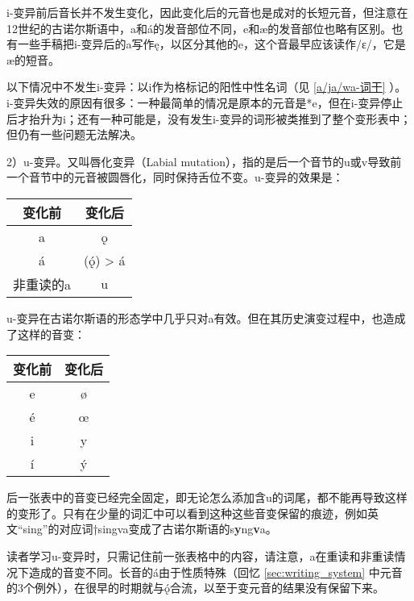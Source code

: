 i-变异前后音长并不发生变化，因此变化后的元音也是成对的长短元音，但注意在12世纪的古诺尔斯语中，a和á的发音部位不同，e和æ的发音部位也略有区别。也有一些手稿把i-变异后的a写作ę，以区分其他的e，这个音最早应该读作/ɛ/，它是æ的短音。

以下情况中不发生i-变异：以i作为格标记的阳性中性名词（见 \ref{a/ja/wa-词干} ）。i-变异失效的原因有很多：一种最简单的情况是原本的元音是*e，但在i-变异停止后才抬升为i；还有一种可能是，没有发生i-变异的词形被类推到了整个变形表中；但仍有一些问题无法解决。

2）u-变异。又叫唇化变异（Labial mutation），指的是后一个音节的u或v导致前一个音节中的元音被圆唇化，同时保持舌位不变。u-变异的效果是：

\begin{table}[H]
  \centering
  \begin{tabular}{cc}
    \hline
    \textbf{变化前} & \textbf{变化后} \\ \hline
    a            & ǫ            \\
    á            & (ǫ́) > á      \\
    非重读的a        & u            \\ \hline
  \end{tabular}
\end{table}

u-变异在古诺尔斯语的形态学中几乎只对a有效。但在其历史演变过程中，也造成了这样的音变：

\begin{table}[H]
  \centering
  \begin{tabular}{cc}
    \hline
    \textbf{变化前} & \textbf{变化后} \\ \hline
    e            & ø            \\
    é            & œ            \\
    i            & y            \\
    í            & ý            \\ \hline
  \end{tabular}
\end{table}

后一张表中的音变已经完全固定，即无论怎么添加含u的词尾，都不能再导致这样的变形了。只有在少量的词汇中可以看到这种这些音变保留的痕迹，例如英文``sing''的对应词†singva变成了古诺尔斯语的s\textbf{y}ng\textbf{v}a。

读者学习u-变异时，只需记住前一张表格中的内容，请注意，a在重读和非重读情况下造成的音变不同。长音的á由于性质特殊（回忆 \ref{sec:writing_system} 中元音的3个例外），在很早的时期就与ǫ́合流，以至于变元音的结果没有保留下来。

